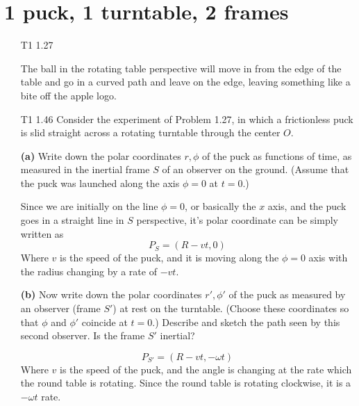 \documentclass[12pt]{article}
\newcommand{\paren}[1]{\left( #1 \right)}
\begin{document}
\section{1 puck, 1 turntable, 2 frames}
\begin{enumerate}
    \item[T1 1.27]

    The ball in the rotating table perspective will move in from the edge of the table and go in a curved path and leave on the edge, leaving something like a bite off the apple logo.

    \item[T1 1.46] Consider the experiment of Problem 1.27, in which a frictionless puck is slid straight across a rotating turntable through the center \(O\).

\textbf{(a)} Write down the polar coordinates \(r, \phi\) of the puck as functions of time, as measured in the inertial frame \(S\) of an observer on the ground. (Assume that the puck was launched along the axis \(\phi = 0\) at \(t = 0\).)

Since we are initially on the line $\phi = 0$, or basically the $x$ axis, and the puck goes in a straight line in $S$ perspective, it's polar coordinate can be simply written as
\[
P_{S} = (R-v t, 0)
\]
Where $v$ is the speed of the puck, and it is moving along the $\phi = 0$ axis with the radius changing by a rate of $-vt$.

\textbf{(b)} Now write down the polar coordinates \(r', \phi'\) of the puck as measured by an observer (frame \(S'\)) at rest on the turntable. (Choose these coordinates so that \(\phi\) and \(\phi'\) coincide at \(t = 0\).) Describe and sketch the path seen by this second observer. Is the frame \(S'\) inertial?

\[
P_{S'} = \paren{ R - vt, -\omega t}
\]
Where $v$ is the speed of the puck, and the angle is changing at the rate which the round table is rotating. Since the round table is rotating clockwise, it is a $-\omega t$ rate. 

\end{enumerate}
\end{document}
